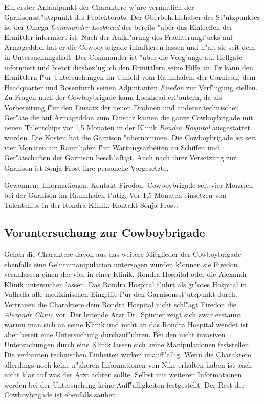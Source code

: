 Ein erster Anlaufpunkt der Charaktere w"are vermutlich der Garnisonsst"utzpunkt des Protektorats. Der Oberbehehlshaber des St"utzpunktes ist der Omega \emph{Commander Lockhead} der bereits "uber das Eintreffen der Ermittler informiert ist. Nach der Aufkl"arung des Frachterungl"ucks auf Armageddon hat er die Cowboybrigade inhaftieren lassen und h"alt sie seit dem in Untersuchungshaft. Der Commander ist "uber die Vorg"ange auf Hellgate informiert und bietet diesbez"uglich den Ermittlern seine Hilfe an. Er kann den Ermittlern f"ur Untersuchungen im Umfeld vom Raumhafen, der Garnison, dem Headquarter und Rosenfurth seinen Adjuntanten \emph{Firedon} zur Verf"ugung stellen. Zu Fragen nach der Cowboybrigade kann Lockhead erl"autern, da\3 als Vorbereitung f"ur den Einsatz der neuen Drohnen und anderer technischer Ger"ate die auf Armageddon zum Einsatz kamen die ganze Cowboybrigade mit neuen Talentchips vor 1,5 Monaten in der Klinik \emph{Rondra Hospital} ausgestattet wurden. Die Kosten hat die Garnison "ubernommen. Die Cowboybrigade ist seit vier Monaten am Raumhafen f"ur Wartungsarbeiten an Schiffen und Ger"atschaften der Garnison besch"aftigt. Auch nach ihrer Versetzung zur Garnison ist Sonja Frost ihre personelle Vorgesetzte.

\begin{remarks}
	Gewonnene Informationen: Kontakt Firedon. Cowboybrigade seit vier Monaten bei der Garnison im Raumhafen t"atig. Vor 1,5 Monaten einsetzen von Talentchips in der Rondra Klinik. Kontakt Sonja Frost.
\end{remarks}



\subsection{Voruntersuchung zur Cowboybrigade}

Gehen die Charaktere davon aus das weitere Mitglieder der Cowboybrigade ebenfalls eine Gehirnmanipulation unterzogen wurden k"onnen sie Firedon veranlassen einen der vier in einer Klinik, Rondra Hospital oder die Alexandr Klinik untersuchen lassen. Das Rondra Hospital f"uhrt als gr"o\3tes Hospital in Valhalla alle medizinischen Eingriffe f"ur den Garnisonsst"utzpunkt durch. Vertrauen die Charaktere dem Rondra Hospital nicht schl"agt Firedon die \emph{Alexandr Clinic} vor. Der leitende Arzt Dr.~Spinner zeigt sich zwar erstaunt warum man sich an seine Klinik und nicht an das Rondra Hospital wendet ist aber bereit eine Untersuchung durchzuf"uhren. Bei den nicht invasiven Untersuchungen durch eine Klinik lassen sich keine Manipulationen feststellen. Die verbauten technischen Einheiten wirken unauff"allig. Wenn die Charaktere allerdings noch keine n"aheren Informationen von Nike erhalten haben ist auch nicht klar auf was der Arzt achten sollte. Selbst mit weiteren Informationen werden bei der Untersuchung keine Auff"alligkeiten festgestellt. Der Rest der Cowboybrigade ist ebenfalls sauber.


